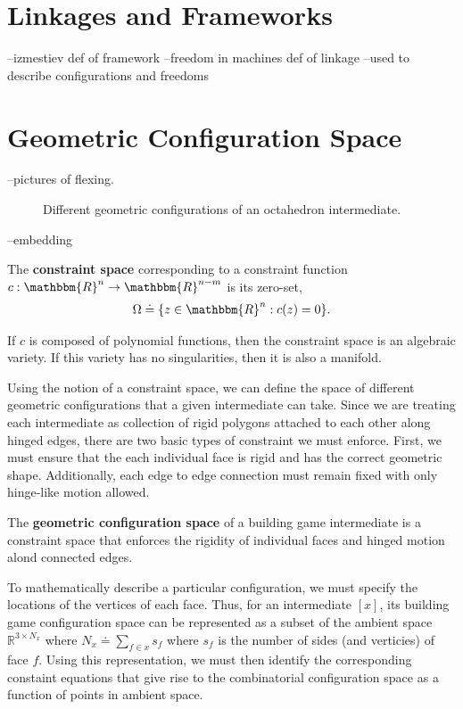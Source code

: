 \section{Linkages and Frameworks}
--izmestiev def of framework
--freedom in machines def of linkage
--used to describe configurations and freedoms 


\section{Geometric Configuration Space}

 --pictures of flexing. 
\begin{figure}[ht]
\caption{Different geometric configurations of an octahedron intermediate.}
\label{fig:OctaGCS}
\end{figure}
--embedding

\begin{mydef}
The \textbf{constraint space} corresponding to a constraint function $c: \mathbbm{R}^n \to \mathbbm{R}^{n-m}$ is its zero-set,
\begin{align}
\Omega \doteq \{z \in \mathbbm{R}^n : c(z) = 0\}.
\end{align}
\end{mydef}
If $c$ is composed of polynomial functions, then the constraint space is an algebraic variety. If this variety has no singularities, then it is also a manifold. 

Using the notion of a constraint space, we can define the space of different geometric configurations that a given intermediate can take. Since we are treating each intermediate as collection of rigid polygons attached to each other along hinged edges, there are two basic types of constraint we must enforce. First, we must ensure that the each individual face is rigid and has the correct geometric shape. Additionally, each edge to edge connection must remain fixed with only hinge-like motion allowed. 
   
\begin{mydef}
The \textbf{geometric configuration space} of a building game intermediate is a constraint space that enforces the rigidity of individual faces and hinged motion alond connected edges.
\end{mydef}

To mathematically describe a particular configuration, we must specify the locations of the vertices of each face. Thus, for an intermediate $[x]$, its building game configuration space can be represented as a subset of the ambient space $\mathbb{R}^{3\times N_x}$ where $N_x \doteq \sum_{f\in x} s_f$ where $s_f$ is the number of sides (and verticies) of face $f$. Using this representation, we must then identify the corresponding constaint equations that give rise to the combinatorial configuration space as a function of points in ambient space. 

